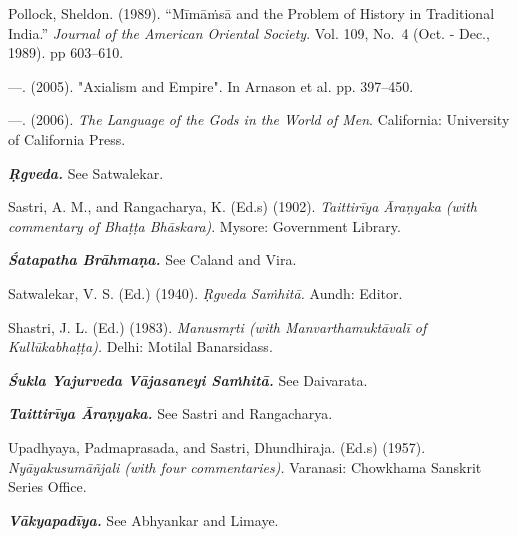 \begin{thebibliography}{99}
  Pollock, Sheldon. (1989). “Mīmāṁsā and the Problem of History in Traditional India.” \textit{Journal of the American Oriental Society}. Vol. 109, No.~4 (Oct. - Dec., 1989). pp 603--610.

  —. (2005). "Axialism and Empire". In Arnason et al. pp. 397--450.

  —. (2006). \textit{The Language of the Gods in the World of Men}. California: University of California Press.

  \textbf{\textit{Ṛgveda.}} See Satwalekar.

  Sastri, A. M., and Rangacharya, K. (Ed.s) (1902). \textit{Taittirīya Āraṇyaka (with commentary of Bhaṭṭa Bhāskara)}. Mysore: Government Library.

  \textbf{\textit{Śatapatha Brāhmaṇa.}} See Caland and Vira.

  Satwalekar, V. S. (Ed.) (1940). \textit{Ṛgveda Saṁhitā.} Aundh: Editor.

  Shastri, J. L. (Ed.) (1983). \textit{Manusmṛti (with Manvarthamuktāvalī of Kullūkabhaṭṭa).} Delhi: Motilal Banarsidass.

  \textbf{\textit{Śukla Yajurveda Vājasaneyi Saṁhitā.}} See Daivarata.

  \textbf{\textit{Taittirīya Āraṇyaka.}} See Sastri and Rangacharya.

  Upadhyaya, Padmaprasada, and Sastri, Dhundhiraja. (Ed.s) (1957). \textit{Nyāyakusumāñjali (with four commentaries).} Varanasi: Chowkhama Sanskrit Series Office.

  \textbf{\textit{Vākyapadīya.}} See Abhyankar and Limaye.

 \end{thebibliography}

\egroup

\egroup

